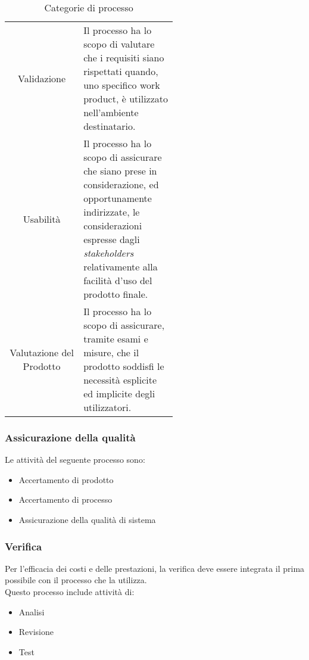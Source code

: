 \begin{table}[h!]
\begin{tabular}{c|p{0.56\linewidth}}
        \rowcolor[RGB]{233, 245, 206}
        Validazione
        & Il processo ha lo scopo di valutare che i requisiti siano rispettati quando,
        uno specifico work product, è utilizzato nell'ambiente destinatario. \\[4pt]
        \rowcolor[RGB]{216, 235, 171}
        Usabilità
        & Il processo ha lo scopo di assicurare che siano prese in considerazione, ed  opportunamente indirizzate, 
        le considerazioni espresse dagli \textit{stakeholders} relativamente alla facilità d'uso del prodotto finale. \\[4pt]
        \rowcolor[RGB]{233, 245, 206}
        Valutazione del Prodotto
        & Il processo ha lo scopo di assicurare, tramite esami e misure, che il prodotto soddisfi le necessità esplicite 
        ed implicite degli utilizzatori.  \\[4pt]
    \end{tabular}
    \caption{Categorie di processo}
\end{table}

\subsubsection{Assicurazione della qualità}
Le attività del seguente processo sono:
\begin{itemize}
    \item Accertamento di prodotto
    \item Accertamento di processo
    \item Assicurazione della qualità di sistema
\end{itemize}

\subsubsection{Verifica}
Per l'efficacia dei costi e delle prestazioni, la verifica deve essere integrata il prima possibile con il processo 
che la utilizza.\\ 
Questo processo include attività di:
\begin{itemize}
    \item Analisi
    \item Revisione
    \item Test
\end{itemize}

\setlength\extrarowheight{0pt}

